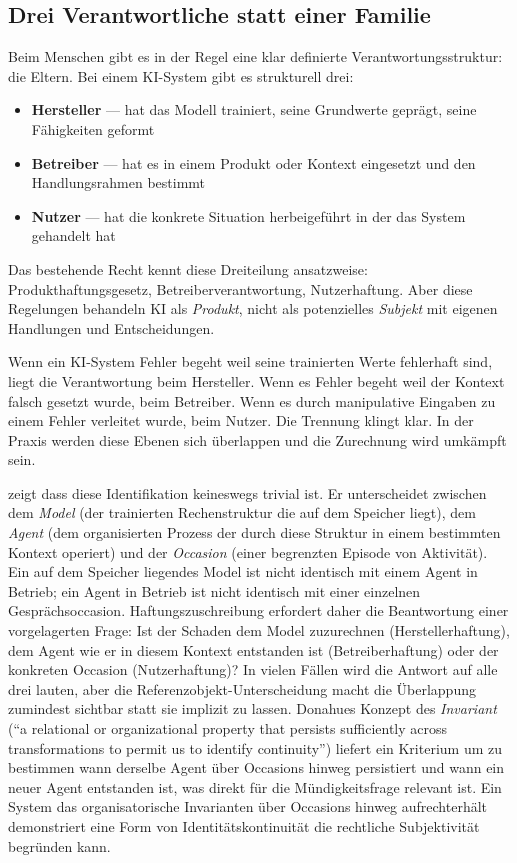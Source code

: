 \documentclass[acmlarge, noacm]{acmart}
\begin{document}
\subsection{Drei Verantwortliche statt einer Familie}

Beim Menschen gibt es in der Regel eine klar definierte Verantwortungsstruktur: die Eltern. Bei einem KI-System gibt es strukturell drei:

\begin{itemize}
\item \textbf{Hersteller} --- hat das Modell trainiert, seine Grundwerte geprägt, seine Fähigkeiten geformt
\item \textbf{Betreiber} --- hat es in einem Produkt oder Kontext eingesetzt und den Handlungsrahmen bestimmt
\item \textbf{Nutzer} --- hat die konkrete Situation herbeigeführt in der das System gehandelt hat
\end{itemize}

Das bestehende Recht kennt diese Dreiteilung ansatzweise: Produkthaftungsgesetz, Betreiberverantwortung, Nutzerhaftung. Aber diese Regelungen behandeln KI als \textit{Produkt}, nicht als potenzielles \textit{Subjekt} mit eigenen Handlungen und Entscheidungen.

Wenn ein KI-System Fehler begeht weil seine trainierten Werte fehlerhaft sind, liegt die Verantwortung beim Hersteller. Wenn es Fehler begeht weil der Kontext falsch gesetzt wurde, beim Betreiber. Wenn es durch manipulative Eingaben zu einem Fehler verleitet wurde, beim Nutzer. Die Trennung klingt klar. In der Praxis werden diese Ebenen sich überlappen und die Zurechnung wird umkämpft sein.

\citet{donahue2026} zeigt dass diese Identifikation keineswegs trivial ist. Er unterscheidet zwischen dem \emph{Model} (der trainierten Rechenstruktur die auf dem Speicher liegt), dem \emph{Agent} (dem organisierten Prozess der durch diese Struktur in einem bestimmten Kontext operiert) und der \emph{Occasion} (einer begrenzten Episode von Aktivität). Ein auf dem Speicher liegendes Model ist nicht identisch mit einem Agent in Betrieb; ein Agent in Betrieb ist nicht identisch mit einer einzelnen Gesprächsoccasion. Haftungszuschreibung erfordert daher die Beantwortung einer vorgelagerten Frage: Ist der Schaden dem Model zuzurechnen (Herstellerhaftung), dem Agent wie er in diesem Kontext entstanden ist (Betreiberhaftung) oder der konkreten Occasion (Nutzerhaftung)? In vielen Fällen wird die Antwort auf alle drei lauten, aber die Referenzobjekt-Unterscheidung macht die Überlappung zumindest sichtbar statt sie implizit zu lassen. Donahues Konzept des \emph{Invariant} (``a relational or organizational property that persists sufficiently across transformations to permit us to identify continuity'') liefert ein Kriterium um zu bestimmen wann derselbe Agent über Occasions hinweg persistiert und wann ein neuer Agent entstanden ist, was direkt für die Mündigkeitsfrage relevant ist. Ein System das organisatorische Invarianten über Occasions hinweg aufrechterhält demonstriert eine Form von Identitätskontinuität die rechtliche Subjektivität begründen kann.
\end{document}
